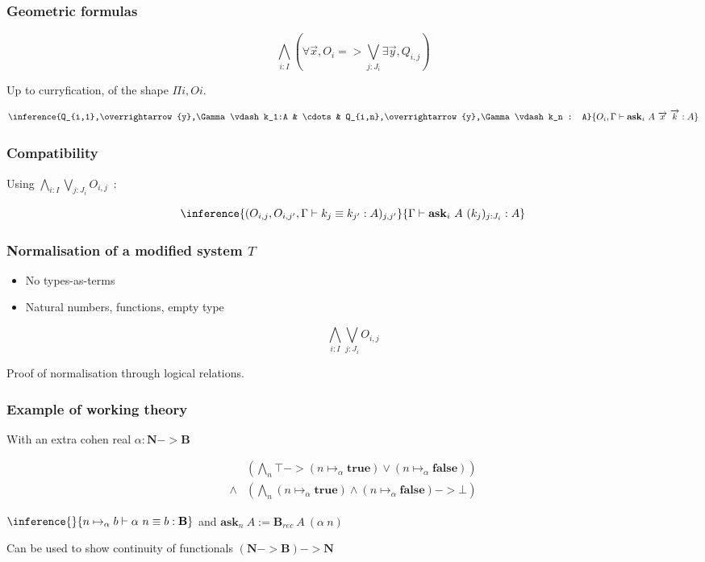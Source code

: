 \documentclass{beamer}
\newcommand{\0}{\boldsymbol{0}}
\newcommand{\1}{\boldsymbol{1}}
\begin{document}
\begin{frame}
    \frametitle{Geometric formulas}

    $$\bigwedge_{i : I}\left(\forall \overrightarrow{x}, O_i => \bigvee_{j : J_i}\exists \overrightarrow{y}, Q_{i,j}\right)$$
    \vspace{0.5cm}

    Up to curryfication, of the shape $\Pi i, O i$.


    $$ \inference{Q_{i,1},\overrightarrow{y},\Gamma\vdash k_1:A & \cdots & Q_{i,n},\overrightarrow{y},\Gamma\vdash k_n : A}{O_i,\Gamma\vdash \mathbf{ask}_i\ A\ \overrightarrow{x}\ \overrightarrow{k} : A}$$
\end{frame}
\begin{frame}
    \frametitle{Compatibility}
    Using $\bigwedge_{i : I}\bigvee_{j : J_i} O_{i,j}$~:

    $$\inference{(O_{i,j},O_{i,j'},\Gamma\vdash k_j\equiv k_{j'}:A)_{j,j'}}{\Gamma\vdash\mathbf{ask}_i\ A\ (k_j)_{j : J_i}:A}$$
\end{frame}
\begin{frame}
    \frametitle{Normalisation of a modified system $T$}
    \begin{itemize}
        \item No types-as-terms
        \item Natural numbers, functions, empty type
    \end{itemize}
    $$\bigwedge_{i : I}\bigvee_{j : J_i} O_{i,j}$$

    Proof of normalisation through logical relations.
\end{frame}

\begin{frame}
    \frametitle{Example of working theory}
    With an extra cohen real $\alpha : \mathbf{N} -> \mathbf{B}$

    $$ \begin{array}{rl}
        &\left(\bigwedge_{n} \top -> (n \mapsto_\alpha \mathbf{true}) \vee (n \mapsto_\alpha \mathbf{false})\right)\\
        \land &\left(\bigwedge_{n } (n\mapsto_\alpha \mathbf{true}) \wedge (n \mapsto_\alpha \mathbf{false}) -> \bot \right)
    \end{array} $$
    \vspace{0cm} 

\centering $\inference{}{n\mapsto_\alpha b\vdash\alpha\ n \equiv b : \mathbf{B}}$ and $\mathbf{ask}_n\ A:= \mathbf{B}_{rec}\ A\ (\alpha\ n)$
\vspace{0.5cm}

Can be used to show continuity of functionals $(\mathbf{N} -> \mathbf{B}) -> \mathbf{N}$

\end{frame}
\end{document}
